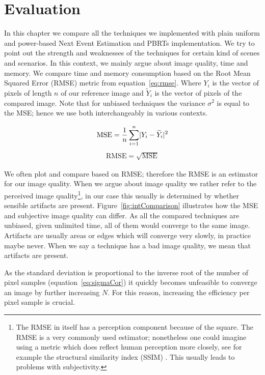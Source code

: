 \chapter{Evaluation}
\label{ch:Evaluation}
In this chapter we compare all the techniques we implemented with plain uniform and power-based Next Event Estimation and PBRTs implementation. We try to point out the strength and weaknesses of the techniques for certain kind of scenes and scenarios. In this context, we mainly argue about image quality, time and memory. We compare time and memory consumption based on the Root Mean Squared Error (RMSE) metric from equation~\ref{eq:rmse}. Where $Y_i$ is the vector of pixels of length $n$ of our reference image and $\widetilde{Y}_i$ is the vector of pixels of the compared image. Note that for unbiased techniques the variance $\sigma^2$ is equal to the MSE; hence we use both interchangeably in various contexts. 

\begin{align}\label{eq:mse}
\text{MSE} = \frac{1}{n}\sum_{i=1}^{n}\lvert Y_i - \widetilde{Y}_i\rvert^2
\end{align}
\begin{align}\label{eq:rmse}
\text{RMSE} = \sqrt{\text{MSE}}
\end{align}


We often plot and compare based on RMSE; therefore the RMSE is an estimator for our image quality. When we argue about image quality we rather refer to the perceived image quality\footnote{The RMSE in itself has a perception component because of the square. The RMSE is a very commonly used estimator; nonetheless one could imagine using a metric which does reflect human perception more closely, see for example the structural similarity index (SSIM) \parencite{DBLP:journals/tip/WangBSS04}. This usually leads to problems with subjectivity.}, in our case this usually is determined by whether sensible artifacts are present. Figure~\ref{fig:intComparison} illustrates how the MSE and subjective image quality can differ. As all the compared techniques are unbiased, given unlimited time, all of them would converge to the same image. Artifacts are usually areas or edges which will converge very slowly, in practice maybe never. When we say a technique has a bad image quality, we mean that artifacts are present. 

As the standard deviation is proportional to the inverse root of the number of pixel samples (equation~\ref{eq:sigmaCor}) it quickly becomes unfeasible to converge an image by further increasing $N$. For this reason, increasing the efficiency per pixel sample is crucial.

